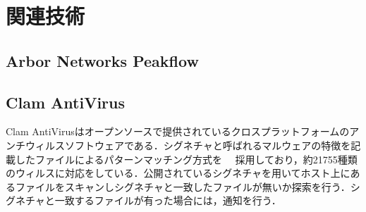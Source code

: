 \section{関連技術}

\subsection{Arbor Networks Peakflow}

\subsection{Clam AntiVirus}
Clam AntiVirusはオープンソースで提供されているクロスプラットフォームのアンチウィルスソフトウェアである．シグネチャと呼ばれるマルウェアの特徴を記載したファイルによるパターンマッチング方式を　
採用しており，約21755種類のウィルスに対応をしている．公開されているシグネチャを用いてホスト上にあるファイルをスキャンしシグネチャと一致したファイルが無いか探索を行う．シグネチャと一致するファイルが有った場合には，通知を行う．
